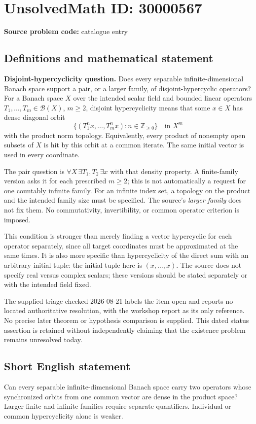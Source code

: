 \documentclass[11pt]{article}
\newcommand{\Z}{\mathbb{Z}}
\begin{document}
\section*{UnsolvedMath ID: 30000567}
\textbf{Source problem code:} catalogue entry
\subsection{Definitions and mathematical statement}
\textbf{Disjoint-hypercyclicity question.} Does every separable infinite-dimensional Banach space support a pair, or a larger family, of disjoint-hypercyclic operators? For a Banach space \(X\) over the intended scalar field and bounded linear operators \(T_1,\ldots,T_m\in\mathcal B(X)\), \(m\ge2\), disjoint hypercyclicity means that some \(x\in X\) has dense diagonal orbit\[\{(T_1^nx,\ldots,T_m^nx):n\in\Z_{\ge0}\}\quad\text{in }X^m\] with the product norm topology. Equivalently, every product of nonempty open subsets of \(X\) is hit by this orbit at a common iterate. The same initial vector is used in every coordinate.\par The pair question is \(\forall X\,\exists T_1,T_2\,\exists x\) with that density property. A finite-family version asks it for each prescribed \(m\ge2\); this is not automatically a request for one countably infinite family. For an infinite index set, a topology on the product and the intended family size must be specified. The source's \emph{larger family} does not fix them. No commutativity, invertibility, or common operator criterion is imposed.\par This condition is stronger than merely finding a vector hypercyclic for each operator separately, since all target coordinates must be approximated at the same times. It is also more specific than hypercyclicity of the direct sum with an arbitrary initial tuple: the initial tuple here is \((x,\ldots,x)\). The source does not specify real versus complex scalars; these versions should be stated separately or with the intended field fixed.\par The supplied triage checked 2026-08-21 labels the item open and reports no located authoritative resolution, with the workshop report as its only reference. No precise later theorem or hypothesis comparison is supplied. This dated status assertion is retained without independently claiming that the existence problem remains unresolved today.
\subsection{Short English statement}
Can every separable infinite-dimensional Banach space carry two operators whose synchronized orbits from one common vector are dense in the product space? Larger finite and infinite families require separate quantifiers. Individual or common hypercyclicity alone is weaker.
\end{document}
